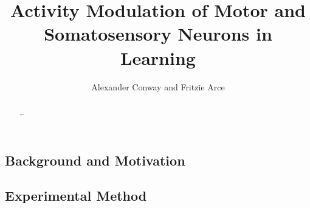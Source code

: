 \documentclass[11pt,a4paper]{article}
\title{Activity Modulation of Motor and Somatosensory Neurons in Learning}
\author{Alexander Conway and Fritzie Arce}
\begin{document}
\begin{abstract}
\dots 
\end{abstract}

\toc

\subsection{Background and Motivation}
\subsection{Experimental Method}

\Section{\dots}

\end{document}
